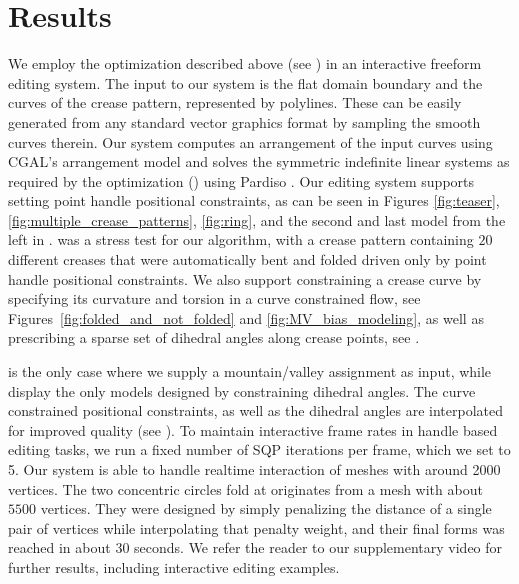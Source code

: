 \section{Results} \label{sec:results}

We employ the optimization described above (see ) in an interactive freeform editing system. The input to our system is the flat domain boundary and the curves of the crease pattern, represented by polylines. These can be easily generated from any standard vector graphics format by sampling the smooth curves therein. Our system computes an arrangement of the input curves using CGAL's arrangement model \cite{cgal,cgal_arr1,cgal_arr2} and solves the symmetric indefinite  linear systems as required by the optimization () using Pardiso \cite{PARDISO1,PARDISO2,PARDISO3}. Our editing system supports setting point handle positional constraints, as can be seen in Figures \ref{fig:teaser}, \ref{fig:multiple_crease_patterns}, \ref{fig:ring}, and the second and last model from the left in .  was a stress test for our algorithm, with a crease pattern containing $20$ different creases that were automatically bent and folded driven only by point handle positional constraints. We also support  constraining a crease curve by specifying its curvature and torsion in a curve constrained flow,  see Figures~\ref{fig:folded_and_not_folded} and \ref{fig:MV_bias_modeling}, as well as prescribing a sparse set of dihedral angles along crease points, see . 

 is the only case where we supply a mountain/valley assignment as input, while  display the only models designed by constraining dihedral angles. The curve constrained positional constraints, as well as the dihedral angles are interpolated for improved quality (see ). To maintain interactive frame rates in handle based editing tasks, we run a fixed number of SQP iterations per frame, which we set to 5. Our system is able to handle realtime interaction of meshes with around 2000 vertices. The two concentric circles fold at  originates from a mesh with about $5500$ vertices. They were designed by simply penalizing the distance of a single pair of vertices while interpolating that penalty weight, and their final forms was reached in about 30 seconds. We refer the reader to our supplementary video for further results, including interactive editing examples. 

